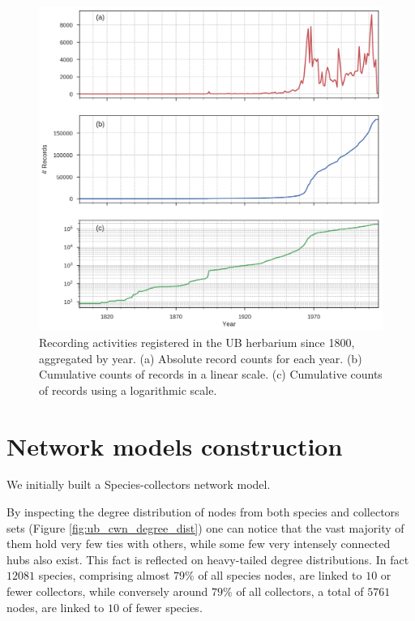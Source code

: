   \begin{figure}[h!]
  	\centering
    \includegraphics[width=\linewidth]{figures/ub_records_timeseries.png}
    \caption{Recording activities registered in the UB herbarium since 1800, aggregated by year. (a) Absolute record counts for each year. (b) Cumulative counts of records in a linear scale. (c) Cumulative counts of records using a logarithmic scale.}
    \label{fig:ub_records_timeseries}
  \end{figure}


\section{Network models construction}


We initially built a Species-collectors network model.

By inspecting the degree distribution of nodes from both species and collectors sets (Figure \ref{fig:ub_cwn_degree_dist}) one can notice that the vast majority of them hold very few ties with others, while some few very intensely connected hubs also exist. 
This fact is reflected on heavy-tailed degree distributions. 
In fact $12081$ species, comprising almost $79\%$ of all species nodes, are linked to $10$ or fewer collectors, while conversely around $79\%$ of all collectors, a total of $5761$ nodes, are linked to $10$ of fewer species.


